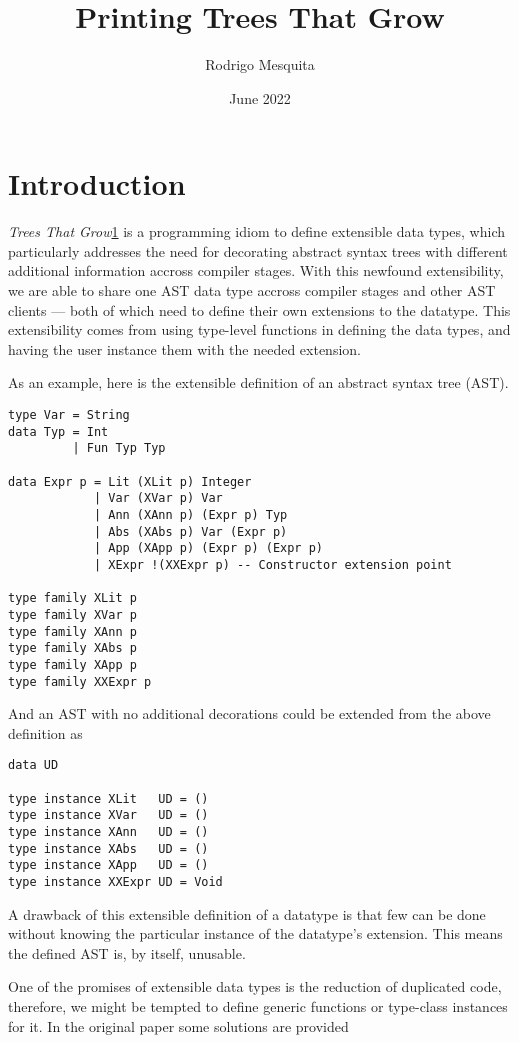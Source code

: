 \documentclass{article}
\title{Printing Trees That Grow}
\author{Rodrigo Mesquita}
\date{June 2022}
\begin{document}
\maketitle

\section{Introduction}

\emph{Trees That Grow}\ref{} is a programming idiom to define extensible data
types, which particularly addresses the need for decorating abstract syntax
trees with different additional information accross compiler stages. With this
newfound extensibility, we are able to share one AST data type accross compiler
stages and other AST clients --- both of which need to define their own
extensions to the datatype. This extensibility comes from using type-level
functions in defining the data types, and having the user instance them with the
needed extension.

As an example, here is the extensible definition of an abstract syntax tree
(AST).

\begin{lstlisting}
type Var = String
data Typ = Int
         | Fun Typ Typ

data Expr p = Lit (XLit p) Integer
            | Var (XVar p) Var
            | Ann (XAnn p) (Expr p) Typ
            | Abs (XAbs p) Var (Expr p)
            | App (XApp p) (Expr p) (Expr p)
            | XExpr !(XXExpr p) -- Constructor extension point

type family XLit p
type family XVar p
type family XAnn p
type family XAbs p
type family XApp p
type family XXExpr p
\end{lstlisting}

And an AST with no additional decorations could be extended from the above
definition as

\begin{lstlisting}
data UD

type instance XLit   UD = ()
type instance XVar   UD = ()
type instance XAnn   UD = ()
type instance XAbs   UD = ()
type instance XApp   UD = ()
type instance XXExpr UD = Void
\end{lstlisting}

A drawback of this extensible definition of a datatype is that few can be done
without knowing the particular instance of the datatype's extension.
This means the defined AST is, by itself, unusable.

One of the promises of extensible data types is the reduction of duplicated
code, therefore, we might be tempted to define generic functions or type-class
instances for it. In the original paper some solutions are provided
\end{document}
